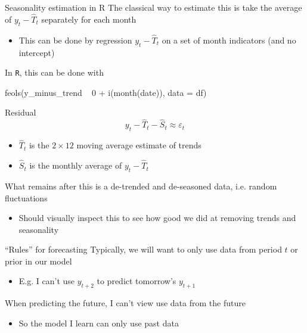 \documentclass[aspectratio=169,t,11pt,table]{beamer}
\begin{document}
\begin{frame}[fragile]{Seasonality estimation in R}
  The classical way to estimate this is take the average of $y_t - \hat{T}_t$ separately for each month
  \begin{itemize}
    \item This can be done by regression $y_t - \hat{T}_t$ on a set of month indicators (and no intercept)
  \end{itemize}

  \bigskip
  In \texttt{R}, this can be done with 
  \begin{codeblock}
feols(y_minus_trend ~ 0 + i(month(date)), data = df)
  \end{codeblock}
\end{frame}


\begin{frame}{Residual}
  \vspace*{-\bigskipamount}
  $$
    y_t - \hat{T}_t - \hat{S}_t \approx \varepsilon_t
  $$
  \begin{itemize}
    \item $\hat{T}_t$ is the $2 \times 12$ moving average estimate of trends
    
    \item $\hat{S}_t$ is the monthly average of $y_t - \hat{T}_t$
  \end{itemize}

  \bigskip
  What remains after this is a de-trended and de-seasoned data, i.e. random fluctuations
  \begin{itemize}
    \item Should visually inspect this to see how good we did at removing trends and seasonality
  \end{itemize}
\end{frame}


\begin{frame}{``Rules'' for forecasting}
  Typically, we will want to only use data from period $t$ or prior in our model 
  \begin{itemize}
    \item E.g. I can't use $y_{t+2}$ to predict tomorrow's $y_{t+1}$ 
  \end{itemize}

  \bigskip
  When predicting the future, I can't view use data from the future
  \begin{itemize}
    \item So the model I learn can only use past data
  \end{itemize}
\end{frame}
\end{document}

